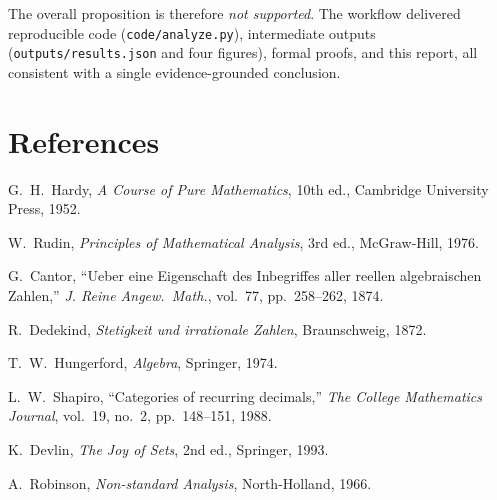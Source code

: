 \documentclass[11pt,a4paper]{article}
\begin{document}
The overall proposition is therefore \emph{not supported}. The workflow
delivered reproducible code (\texttt{code/analyze.py}), intermediate outputs
(\texttt{outputs/results.json} and four figures), formal proofs, and this
report, all consistent with a single evidence-grounded conclusion.

\section{References}
\label{sec:refs}

\begin{enumerate}[label={[\arabic*]}, itemsep=2pt]
  \item G.\ H.\ Hardy, \emph{A Course of Pure Mathematics}, 10th ed.,
        Cambridge University Press, 1952.
  \item W.\ Rudin, \emph{Principles of Mathematical Analysis}, 3rd ed.,
        McGraw-Hill, 1976.
  \item G.\ Cantor, ``Ueber eine Eigenschaft des Inbegriffes aller reellen
        algebraischen Zahlen,'' \emph{J. Reine Angew.\ Math.}, vol.\ 77,
        pp.~258--262, 1874.
  \item R.\ Dedekind, \emph{Stetigkeit und irrationale Zahlen}, Braunschweig,
        1872.
  \item T.\ W.\ Hungerford, \emph{Algebra}, Springer, 1974.
  \item L.\ W.\ Shapiro, ``Categories of recurring decimals,'' \emph{The
        College Mathematics Journal}, vol.\ 19, no.\ 2, pp.~148--151, 1988.
  \item K.\ Devlin, \emph{The Joy of Sets}, 2nd ed., Springer, 1993.
  \item A.\ Robinson, \emph{Non-standard Analysis}, North-Holland, 1966.
\end{enumerate}
\end{document}
